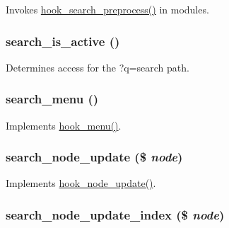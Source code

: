 \label{search_8module_ae0bcee62601fbc35d2651764a04e5591}
Invokes \hyperlink{group__search_ga3c935c295da9103bc7184f6ec869c533}{hook\_\-search\_\-preprocess()} in modules. \hypertarget{search_8module_ade9a3743480b1b0ea05d80f54b466442}{
\subsubsection[{search\_\-is\_\-active}]{\setlength{\rightskip}{0pt plus 5cm}search\_\-is\_\-active ()}}
\label{search_8module_ade9a3743480b1b0ea05d80f54b466442}
Determines access for the ?q=search path. \hypertarget{search_8module_ac0cbdaa688ee15c024867c96b54a4036}{
\subsubsection[{search\_\-menu}]{\setlength{\rightskip}{0pt plus 5cm}search\_\-menu ()}}
\label{search_8module_ac0cbdaa688ee15c024867c96b54a4036}
Implements \hyperlink{group__hooks_ga5c95244fea59b25666e409759e133ded}{hook\_\-menu()}. \hypertarget{search_8module_a1067f1570b24d9647ec628bd93762bdd}{
\subsubsection[{search\_\-node\_\-update}]{\setlength{\rightskip}{0pt plus 5cm}search\_\-node\_\-update (\$ {\em node})}}
\label{search_8module_a1067f1570b24d9647ec628bd93762bdd}
Implements \hyperlink{group__node__api__hooks_gac66c767cc922fcbfdaf17252e5d87d9d}{hook\_\-node\_\-update()}. \hypertarget{search_8module_ad314916727aaf74780b647fa381c89f6}{
\subsubsection[{search\_\-node\_\-update\_\-index}]{\setlength{\rightskip}{0pt plus 5cm}search\_\-node\_\-update\_\-index (\$ {\em node})}}

